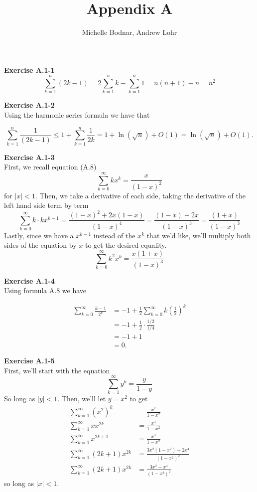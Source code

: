 \documentclass{article}
\title{Appendix A}
\author{Michelle Bodnar, Andrew Lohr}
\begin{document}
\maketitle

\noindent\textbf{Exercise A.1-1}\\

\[
\sum_{k=1}^{n} (2k -1) = 2\sum_{k=1}^{n} k - \sum_{k=1}^n 1 = n(n+1) - n = n^2
\]


\noindent\textbf{Exercise A.1-2}\\

Using the harmonic series formula we have that

\[\sum_{k=1}^n \frac{1}{(2k-1)} \leq 1 + \sum_{k=1}^n \frac{1}{2k} =  1 + \ln(\sqrt{n}) + O(1) =  \ln(\sqrt{n}) + O(1).\]

\noindent\textbf{Exercise A.1-3}\\
First, we recall equation (A.8)
\[
\sum_{k=0}^\infty k x^k = \frac{x}{(1-x)^2}
\]
for $|x|<1$. Then, we take a derivative of each side, taking the derivative of the left hand side term by term
\[
\sum_{k=0}^\infty k\cdot kx^{k-1} = \frac{(1-x)^2 + 2x (1-x)}{(1-x)^4} = \frac{(1-x) + 2x}{(1-x)^3} = \frac{(1+x)}{(1-x)^3}
\]
Lastly, since we have a $x^{k-1}$ instead of the $x^k$ that we'd like, we'll multiply both sides of the equation by $x$ to get the desired equality.
\[
\sum_{k=0}^\infty k^2 x^k = \frac{x(1+x)}{(1-x)^3}
\]

\noindent\textbf{Exercise A.1-4}\\

Using formula A.8 we have

\begin{align*}
\sum_{k=0}^\infty \frac{k-1}{2^k} &= -1 + \frac{1}{2} \sum_{k=0}^\infty k\left(\frac{1}{2}\right)^k \\
&= -1 + \frac{1}{2} \cdot \frac{ 1/2}{1/4} \\
&= -1 + 1 \\
&= 0.
\end{align*}

\noindent\textbf{Exercise A.1-5}\\

First, we'll start with the equation 
\[
\sum_{k=1}^\infty y^k = \frac{y}{1-y}
\]
So long as $|y|<1$. Then, we'll let $y = x^2$ to get 
\begin{align*}
\sum_{k=1}^\infty (x^2)^k &= \frac{x^2}{1-x^2}\\
\sum_{k=1}^\infty xx^{2k} &= \frac{x^3}{1-x^2}\\
\sum_{k=1}^\infty x^{2k+1} &= \frac{x^3}{1-x^2}\\
\sum_{k=1}^\infty (2k+1) x^{2k} &= \frac{3x^2(1-x^2) +2 x^4 }{(1-x^2)^2}\\
\sum_{k=1}^\infty (2k+1) x^{2k} &= \frac{3x^2 - x^4 }{(1-x^2)^2}
\end{align*}
so long as $|x|<1$.\\
\end{document}
